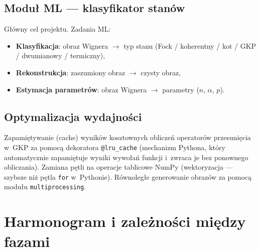 \documentclass[12pt,a4paper]{article}
\begin{document}
\subsection{Moduł ML --- klasyfikator stanów}

Główny cel projektu. Zadania ML:
\begin{itemize}
    \item \textbf{Klasyfikacja}: obraz Wignera $\to$ typ stanu (Fock / koherentny / kot / GKP / dwumianowy / termiczny),
    \item \textbf{Rekonstrukcja}: zaszumiony obraz $\to$ czysty obraz,
    \item \textbf{Estymacja parametrów}: obraz Wignera $\to$ parametry ($n$, $\alpha$, $p$).
\end{itemize}

\subsection{Optymalizacja wydajności}

Zapamiętywanie (cache) wyników kosztownych obliczeń operatorów przesunięcia w~GKP za pomocą dekoratora \texttt{@lru\_cache} (mechanizm Pythona, który automatycznie zapamiętuje wyniki wywołań funkcji i~zwraca je bez ponownego obliczania). Zamiana pętli na operacje tablicowe NumPy (wektoryzacja --- szybsze niż pętla \texttt{for} w~Pythonie). Równoległe generowanie obrazów za pomocą modułu \texttt{multiprocessing}.

\section{Harmonogram i zależności między fazami}
\label{sec:harmonogram}
\end{document}
